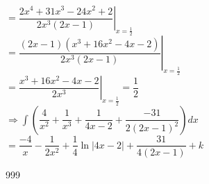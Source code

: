\documentclass[a4paper]{article}
\begin{document}
$= \left. \dfrac{2x^4+31x^3-24x^2+2}{2x^3(2x-1)} \right|_{x=\tfrac{1}{2}}$\\

$= \left. \dfrac{(2x-1)(x^3+16x^2-4x-2)}{2x^3(2x-1)} \right|_{x=\tfrac{1}{2}}$\\

$= \left. \dfrac{x^3+16x^2-4x-2}{2x^3} \right|_{x=\tfrac{1}{2}}= \dfrac{1}{2}$\\

$\Rightarrow \displaystyle\int \left(\dfrac{4}{x^2}+\dfrac{1}{x^3}+\dfrac{1}{4x-2}+\dfrac{-31}{2\left(2x-1\right)^2}\right)dx$\\


$\boxed{= \dfrac{-4}{x}-\dfrac{1}{2x^2}+\dfrac{1}{4}\ln{\left|4x-2\right|+\dfrac{31}{4\left(2x-1\right)}+k}}$\\



\begin{thebibliography}{999}
\end{thebibliography}
\end{document}
